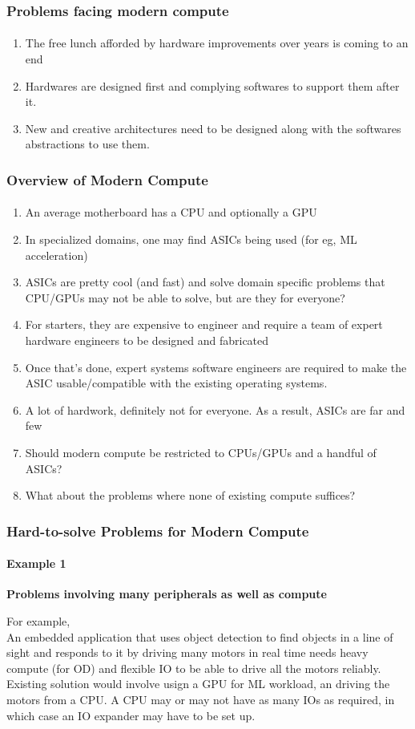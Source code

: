\documentclass{beamer}
\begin{document}
\begin{frame}[fragile]
\frametitle{Problems facing modern compute}
  \framesubtitle{}
  \begin{enumerate}
    \item The free lunch afforded by hardware improvements over years
      is coming to an end
    \item Hardwares are designed first and complying softwares to support
      them after it.
    \item New and creative architectures need to be designed along with the
      softwares abstractions to use them. 
  \end{enumerate}
\end{frame}


\begin{frame}[fragile]
\frametitle{Overview of Modern Compute}
\framesubtitle{}
  \begin{enumerate}
    \item An average motherboard has a CPU and optionally a GPU
    \item In specialized domains, one may find ASICs being used (for eg, 
      ML acceleration)
    \item ASICs are pretty cool (and fast) and solve domain specific problems
      that CPU/GPUs may not be able to solve, but are they for everyone?
    \item For starters, they are expensive to engineer and require a team
      of expert hardware engineers to be designed and fabricated
    \item Once that's done, expert systems software engineers are required
      to make the ASIC usable/compatible with the existing operating systems.
    \item A lot of hardwork, definitely not for everyone.  As a result, ASICs are far and few
    \item Should modern compute be restricted to CPUs/GPUs and a handful
      of ASICs?
    \item What about the problems where none of existing compute suffices?
  \end{enumerate}
\end{frame}

\begin{frame}[fragile]
  \frametitle{Hard-to-solve Problems for Modern Compute}
  \framesubtitle{Example 1}
  \textbf{Problems involving many peripherals as well as compute}

  For example, \\

  An embedded application that uses object detection to find
  objects in a line of sight and responds to it by driving many motors in
  real time needs heavy compute (for OD) and flexible IO to be able to 
  drive all the motors reliably. \\

  Existing solution would involve usign a GPU for ML workload, an
  driving the motors from a CPU. A CPU may or may not have as many IOs
  as required, in which case an IO expander may have to be set up.
\end{frame}
\end{document}

